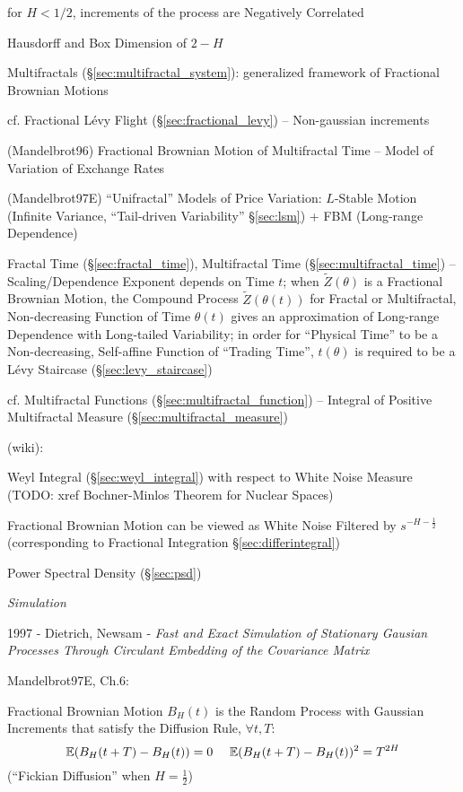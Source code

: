 for $H < 1/2$, increments of the process are Negatively Correlated

Hausdorff and Box Dimension of $2 - H$

\fist Multifractals (\S\ref{sec:multifractal_system}): generalized framework of
Fractional Brownian Motions

cf. Fractional L\'evy Flight (\S\ref{sec:fractional_levy}) -- Non-gaussian
increments

(Mandelbrot96) Fractional Brownian Motion of Multifractal Time -- Model of
Variation of Exchange Rates

(Mandelbrot97E) ``Unifractal'' Models of Price Variation: $L$-Stable Motion
(Infinite Variance, ``Tail-driven Variability'' \S\ref{sec:lsm}) + FBM
(Long-range Dependence)

\fist Fractal Time (\S\ref{sec:fractal_time}), Multifractal Time
(\S\ref{sec:multifractal_time}) -- Scaling/Dependence Exponent depends on Time
$t$; when $\tilde{Z}(\theta)$ is a Fractional Brownian Motion, the Compound
Process $\tilde{Z}(\theta(t))$ for Fractal or Multifractal, Non-decreasing
Function of Time $\theta(t)$ gives an approximation of Long-range Dependence
with Long-tailed Variability; in order for ``Physical Time'' to be a
Non-decreasing, Self-affine Function of ``Trading Time'', $t(\theta)$ is
required to be a L\'evy Staircase (\S\ref{sec:levy_staircase})

cf. Multifractal Functions (\S\ref{sec:multifractal_function}) -- Integral of
Positive Multifractal Measure (\S\ref{sec:multifractal_measure})

(wiki):

Weyl Integral (\S\ref{sec:weyl_integral}) with respect to White Noise Measure
(TODO: xref Bochner-Minlos Theorem for Nuclear Spaces)

Fractional Brownian Motion can be viewed as White Noise Filtered by
$s^{-H-\frac{1}{2}}$ (corresponding to Fractional Integration
\S\ref{sec:differintegral})

Power Spectral Density (\S\ref{sec:psd})

\emph{Simulation}

1997 - Dietrich, Newsam - \emph{Fast and Exact Simulation of Stationary Gausian
  Processes Through Circulant Embedding of the Covariance Matrix}

Mandelbrot97E, Ch.6:

Fractional Brownian Motion $B_H(t)$ is the Random Process with Gaussian
Increments that satisfy the Diffusion Rule, $\forall t, T$:
\[
  \expect(B_H(t+T) - B_H(t)) = 0 \ \ \ \ \expect(B_H(t+T) - B_H(t))^2 = T^{2H}
\]
(``Fickian Diffusion'' when $H = \frac{1}{2}$)

